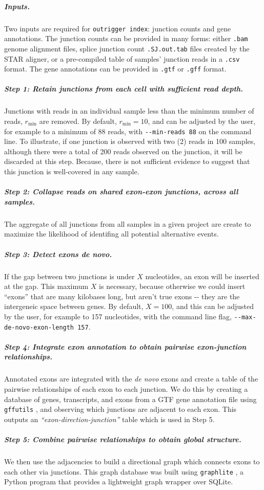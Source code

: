 \subparagraph{Inputs.} Two inputs are required for \texttt{outrigger index}: junction counts and gene annotations. The junction counts can be provided in many forms: either \texttt{.bam} \cite{Group:OEYDIUUE} genome alignment files, splice junction count \texttt{.SJ.out.tab} files created by the STAR aligner\cite{Dobin:2013fg}, or a pre-compiled table of samples' junction reads in a \texttt{.csv} format. The gene annotations can be provided in \texttt{.gtf} or \texttt{.gff} format.

\subparagraph{Step 1: Retain junctions from each cell with sufficient read depth.} Junctions with reads in an individual sample less than the minimum number of reads, $r_{\min}$ are removed. By default, $r_{\min} = 10$, and can be adjusted by the user, for example to a minimum of 88 reads, with \texttt{-{}-min-reads~88} on the command line. To illustrate, if one junction is observed with two (2) reads in 100 samples, although there were a total of 200 reads observed on the junction, it will be discarded at this step. Because, there is not sufficient evidence to suggest that this junction is well-covered in any sample. 

\subparagraph{Step 2: Collapse reads on shared exon-exon junctions, across all samples.} The aggregate of all junctions from all samples in a given project are create to maximize the likelihood of identifing all potential alternative events.

\subparagraph{Step 3: Detect exons \emph{de novo}.} If the gap between two junctions is under $X$ nucleotides, an exon will be inserted at the gap. This maximum $X$ is necessary, because otherwise we could insert ``exons'' that are many kilobases long, but aren't true exons -{}- they are the intergeneic space between genes. By default, $X = 100$, and this can be adjusted by the user, for example to 157 nucleotides, with the command line flag, \texttt{-{}-max-de-novo-exon-length~157}.

\subparagraph{Step 4: Integrate exon annotation to obtain pairwise exon-junction relationships.} Annotated exons are integrated with the \emph{de novo} exons and create a table of the pairwise relationships of each exon to each junction. We do this by creating a database of genes, transcripts, and exons from a GTF gene annotation file using \texttt{gffutils} \cite{Anonymous:sP8uhXuv}, and observing which junctions are adjacent to each exon. This outputs an \emph{``exon-direction-junction''} table which is used in Step 5.

\subparagraph{Step 5: Combine pairwise relationships to obtain global structure.} We then use the adjacencies to build a directional graph which connects exons to each other via junctions. This graph database was built using \texttt{graphlite} \cite{Anonymous:vt}, a Python program that provides a lightweight graph wrapper over SQLite.

